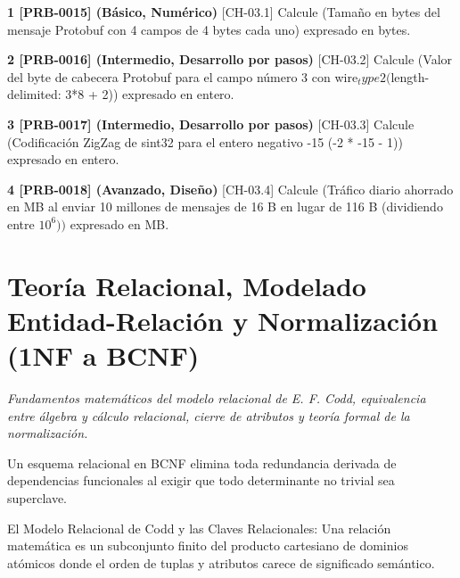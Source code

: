 \documentclass{book}
\begin{document}
\begin{tcolorbox}[title={Ejercicios}, studiumworked, breakable]

\noindent\textbf{1 [PRB-0015] (Básico, Numérico)}
[CH-03.1] Calcule (Tamaño en bytes del mensaje Protobuf con 4 campos de 4 bytes cada uno) expresado en bytes.

\noindent\textbf{2 [PRB-0016] (Intermedio, Desarrollo por pasos)}
[CH-03.2] Calcule (Valor del byte de cabecera Protobuf para el campo número 3 con wire\(_type 2 (\)length-delimited: 3*8 + 2)) expresado en entero.

\noindent\textbf{3 [PRB-0017] (Intermedio, Desarrollo por pasos)}
[CH-03.3] Calcule (Codificación ZigZag de sint32 para el entero negativo -15 (-2 * -15 - 1)) expresado en entero.

\noindent\textbf{4 [PRB-0018] (Avanzado, Diseño)}
[CH-03.4] Calcule (Tráfico diario ahorrado en MB al enviar 10 millones de mensajes de 16 B en lugar de 116 B (dividiendo entre \(10^6))\) expresado en MB.
\end{tcolorbox}

\chapter{Teoría Relacional, Modelado Entidad-Relación y Normalización (1NF a BCNF)}
\label{chap:ch-04}

\noindent\textit{Fundamentos matemáticos del modelo relacional de E. F. Codd, equivalencia entre álgebra y cálculo relacional, cierre de atributos y teoría formal de la normalización.}

\begin{tcolorbox}[title={Consejo}, studiumtip, breakable]

Un esquema relacional en BCNF elimina toda redundancia derivada de dependencias funcionales al exigir que todo determinante no trivial sea superclave.
\end{tcolorbox}

\begin{tcolorbox}[title={Definición}, studiumdef, breakable]

El Modelo Relacional de Codd y las Claves Relacionales: Una relación matemática es un subconjunto finito del producto cartesiano de dominios atómicos donde el orden de tuplas y atributos carece de significado semántico.
\end{tcolorbox}
\end{document}
